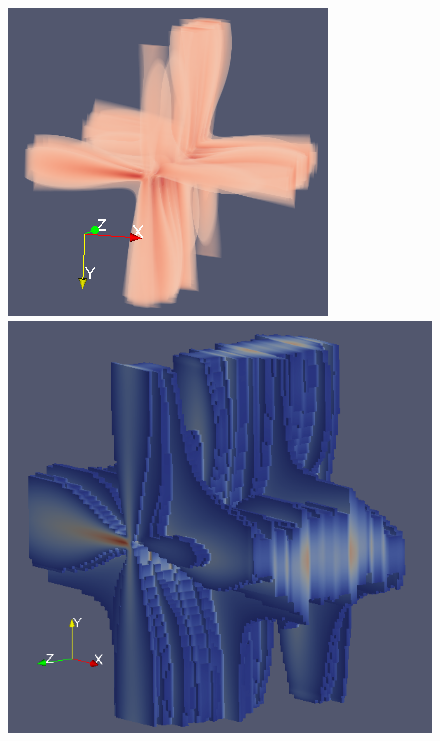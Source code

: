 \documentclass{scrartcl}
\begin{document}
\begin{figure}[!t]
\centering
  \begin{minipage}{0.3\textwidth}
    \includegraphics[height=\textwidth]{img/inverse_isovolume.png}
  \end{minipage}
  \begin{minipage}{0.3\textwidth}
    \includegraphics[height=\textwidth]{img/inverse_surface.png}

\end{minipage}
\end{figure}
\end{document}
